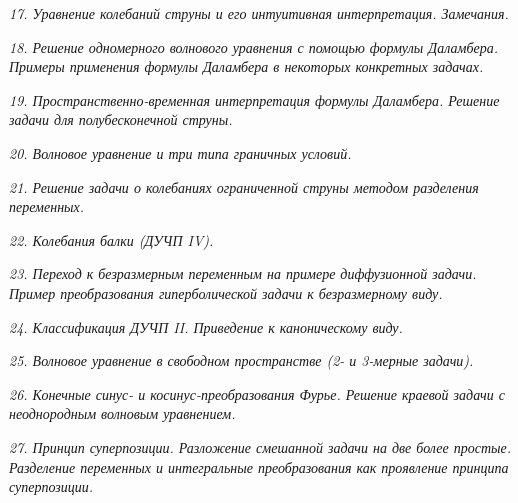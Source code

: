 \emph{17. Уравнение колебаний струны и его интуитивная интерпретация.
Замечания.}

\newpage %

\emph{18. Решение одномерного волнового уравнения с помощью формулы Даламбера.
Примеры применения формулы Даламбера в некоторых конкретных задачах.}

\newpage %

\emph{19. Пространственно-временная интерпретация формулы Даламбера. Решение
задачи для полубесконечной струны.}

\newpage %

\emph{20. Волновое уравнение и три типа граничных условий.}

\newpage %

\emph{21. Решение задачи о колебаниях ограниченной струны методом разделения
переменных.}

\newpage %

\emph{22. Колебания балки (ДУЧП IV).}

\newpage %

\emph{23. Переход к безразмерным переменным на примере диффузионной задачи.
Пример преобразования гиперболической задачи к безразмерному виду.}

\newpage %

\emph{24. Классификация ДУЧП II. Приведение к каноническому виду.}

\newpage %

\emph{25. Волновое уравнение в свободном пространстве (2- и 3-мерные задачи).}

\newpage %

\emph{26. Конечные синус- и косинус-преобразования Фурье. Решение краевой задачи
с неоднородным волновым уравнением.}

\newpage %

\emph{27. Принцип суперпозиции. Разложение смешанной задачи на две более
простые. Разделение переменных и интегральные преобразования как проявление
принципа суперпозиции.}

